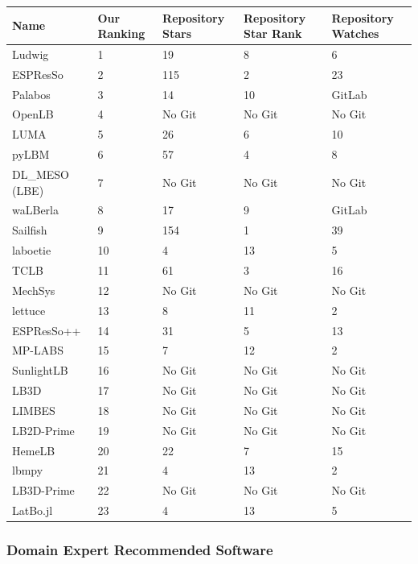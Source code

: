 \documentclass[12pt, notitlepage]{article}
\begin{document}
\begin{center}
	\begin{onehalfspacing}
		\begin{tabular}{ p{3.5cm}p{2.5cm}p{2cm}p{2cm}p{2cm} }
			\hline
			Name & Our Ranking & Repository Stars & Repository Star Rank & Repository Watches \\
			\hline
			Ludwig&1& 19 &8& 6\\
			ESPResSo &2& 115 &2& 23\\
			Palabos &3& 14 &10& GitLab\\
			OpenLB &4& No Git &No Git & No Git\\
			LUMA&5& 26 &6& 10\\
			pyLBM &6& 57&4& 8\\
			DL\_MESO (LBE) & 7 & No Git &No Git & No Git \\
			waLBerla & 8 & 17 &9& GitLab\\
			Sailfish &9& 154 &1& 39\\
			laboetie &10& 4 &13& 5\\
			TCLB &11& 61 &3& 16\\
			MechSys &12& No Git &No Git & No Git\\
			lettuce &13& 8 &11& 2\\
			ESPResSo++ &14& 31 &5& 13\\
			MP-LABS &15& 7 &12& 2\\			
			SunlightLB & 16& No Git &No Git & No Git\\
			LB3D &17& No Git &No Git & No Git\\			
			LIMBES &18& No Git &No Git & No Git\\
			LB2D-Prime &19& No Git &No Git & No Git\\		
			HemeLB &20& 22 &7& 15\\
			lbmpy&21&  4 &13& 2  \\	
			LB3D-Prime &22& No Git &No Git & No Git\\	
			LatBo.jl &23& 4 &13& 5\\			
			\hline
		\end{tabular}
		\label{repometrics}
	\end{onehalfspacing}
\end{center}

\subsubsection{Domain Expert Recommended Software}\label{domainexpertrecommend}
\end{document}
